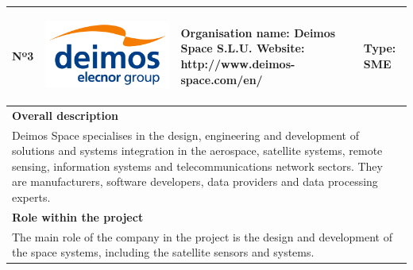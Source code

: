 \begin{longtable}[H]{|p{0.7cm}|p{4cm}|p{7cm}|p{1.3cm}|}
	\hline
	\begin{center} Nº3 \end{center} & \begin{center} \includegraphics[scale=0.05]{./logos/Blue-Logo_White-Background_EN} \end{center} & \begin{center} \textbf{Organisation name:} Deimos Space S.L.U. \newline \textbf{Website:} http://www.deimos-space.com/en/ \end{center} & \begin{center} Type: \newline SME \end{center} \\ \hline
	
	\multicolumn{4}{|p{13cm}|}{\textbf{Overall description}}  \\ \hline
	
	\multicolumn{4}{|p{14.5cm}|}{Deimos Space specialises in the design, engineering and development of solutions and systems integration in the aerospace, satellite systems, remote sensing, information systems and telecommunications network sectors. They are manufacturers, software developers, data providers and data processing experts.}  \\ \hline
	
	\multicolumn{4}{|p{13cm}|}{\textbf{Role within the project}}   \\ \hline
	
	\multicolumn{4}{|p{14.5cm}|}{The main role of the company in the project is the design and development of the space systems, including the satellite sensors and systems.}  \\ \hline
	

\end{longtable}
